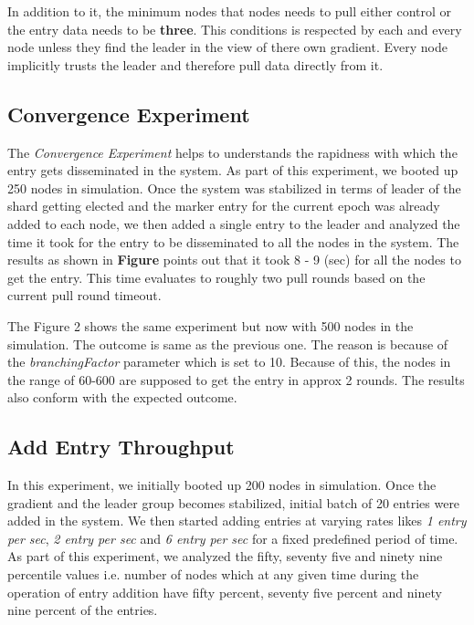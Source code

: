 \documentclass[a4paper, 11pt]{article}
\begin{document}
In addition to it, the minimum nodes that nodes needs to pull either control or the entry data needs to be \textbf{three}. This conditions is respected by each and every node unless they find the leader in the view of there own gradient. Every node implicitly trusts the leader and therefore pull data directly from it.




\subsection{Convergence Experiment}

The \textit{Convergence Experiment} helps to understands the rapidness with which the entry gets disseminated in the system. As part of this experiment, we booted up 250 nodes in simulation. Once the system was stabilized in terms of leader of the shard getting elected and the marker entry for the current epoch was already added to each node, we then added a single entry to the leader and analyzed the time it took for the entry to be disseminated to all the nodes in the system. The results as shown in \textbf{Figure} points out that it took 8 - 9 (sec) for all the nodes to get the entry. This time evaluates to roughly two pull rounds based on the current pull round timeout.


The Figure 2 shows the same experiment but now with 500 nodes in the simulation. The outcome is same as the previous one. The reason is because of the \textit{branchingFactor} parameter which is set to 10. Because of this, the nodes in the range of 60-600 are supposed to get the entry in approx 2 rounds. The results also conform with the expected outcome. 


\subsection{Add Entry Throughput}

In this experiment, we initially booted up 200 nodes in simulation. Once the gradient and the leader group becomes stabilized, initial batch of 20 entries were added in the system. We then started adding entries at varying rates likes \textit{1 entry per sec}, \textit{2 entry per sec} and  \textit{6 entry per sec} for a fixed predefined period of time. As part of this experiment, we analyzed the fifty, seventy five and ninety nine percentile values i.e. number of nodes which at any given time during the operation of entry addition have fifty percent, seventy five percent and ninety nine percent of the entries. 
\end{document}

